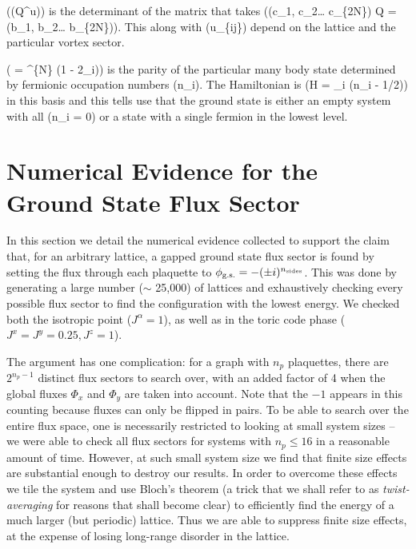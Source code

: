 ((Q\^{}u)) is the determinant of the matrix that takes
((c\_1, c\_2\ldots{} c\_\{2N\}) Q = (b\_1, b\_2\ldots{} b\_\{2N\})).
This along with (\prod u\_\{ij\}) depend on the lattice and the
particular vortex sector.

(\hat{\pi} = \^{}\{N\} (1 - 2\_i)) is the parity of the
particular many body state determined by fermionic occupation numbers
(n\_i). The Hamiltonian is (H = \sum \epsilon\_i (n\_i - 1/2)) in this
basis and this tells use that the ground state is either an empty system
with all (n\_i = 0) or a state with a single fermion in the lowest
level.

\section{Numerical Evidence for the Ground State Flux Sector} \label{apx:ground_state}

In this section we detail the numerical evidence collected to support
the claim that, for an arbitrary lattice, a gapped ground state flux
sector is found by setting the flux through each plaquette to
\(\phi_{\textup{g.s.}} = -(\pm i)^{n_{\textup{sides}}}\). This was done
by generating a large number (\(\sim\) 25,000) of lattices and
exhaustively checking every possible flux sector to find the
configuration with the lowest energy. We checked both the isotropic
point (\(J^\alpha = 1\)), as well as in the toric code phase
(\(J^x = J^y = 0.25, J^z = 1\)).

\par

The argument has one complication: for a graph with \(n_p\) plaquettes,
there are \(2^{n_p - 1}\) distinct flux sectors to search over, with an
added factor of 4 when the global fluxes \(\Phi_x\) and \(\Phi_y\) are
taken into account. Note that the \(-1\) appears in this counting
because fluxes can only be flipped in pairs. To be able to search over
the entire flux space, one is necessarily restricted to looking at small
system sizes -- we were able to check all flux sectors for systems with
\(n_p \leq 16\) in a reasonable amount of time. However, at such small
system size we find that finite size effects are substantial enough to
destroy our results. In order to overcome these effects we tile the
system and use Bloch's theorem (a trick that we shall refer to as
\textit{twist-averaging} for reasons that shall become clear) to
efficiently find the energy of a much larger (but periodic) lattice.
Thus we are able to suppress finite size effects, at the expense of
losing long-range disorder in the lattice.

